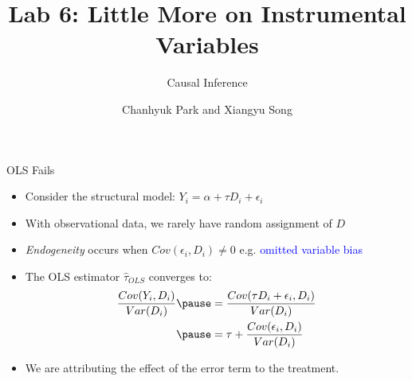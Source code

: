 \documentclass[11pt, handout]{beamer}
\title{Lab 6: Little More on  Instrumental Variables}
\subtitle{Causal Inference}
\author{Chanhyuk Park and Xiangyu Song}
\date{}
\institute{Washington University in St. Louis}
\begin{document}
\begin{frame}
    \titlepage
\end{frame}

\begin{frame}{OLS Fails}
    \begin{itemize}[<+->]
        \item Consider the structural model: $Y_i = \alpha + \tau D_i + \epsilon_i$
        \vspace{0.8em}
        \item With observational data, we rarely have random assignment of $D$
        \vspace{0.8em}
        \item \textit{Endogeneity} occurs when $Cov(\epsilon_i, D_{i}) \neq 0$ e.g. \textcolor{blue}{omitted variable bias}
        \vspace{0.8em}
        \item The OLS estimator $\hat{\tau}_{OLS}$ converges to:
        \begin{equation*}
            \begin{aligned}
                \frac{Cov(Y_{i}, D_i)}{Var(D_i)} \pause &= \frac{Cov(\tau D_{i} + \epsilon_i, D_{i})}{Var(D_{i})} \\ \pause
                 &= \tau + \frac{Cov(\epsilon_i, D_i)}{Var(D_i)} \\
            \end{aligned}
        \end{equation*}
        \vspace{0.8em}
        \item We are attributing the effect of the error term to the treatment.
    \end{itemize}
\end{frame}
\end{document}
